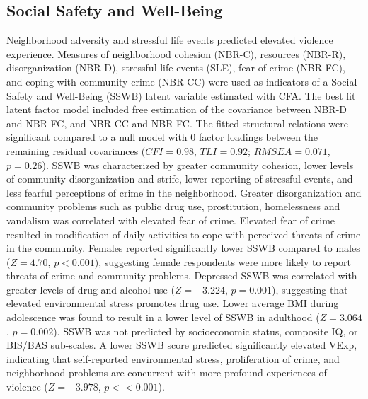 \documentclass[utf8]{article}
\begin{document}
\subsection{Social Safety and Well-Being} Neighborhood adversity and stressful life events predicted elevated violence experience. Measures of neighborhood cohesion (NBR-C), resources (NBR-R), disorganization (NBR-D), stressful life events (SLE), fear of crime (NBR-FC), and coping with community crime (NBR-CC) were used as indicators of a Social Safety and Well-Being (SSWB) latent variable estimated with CFA. The best fit latent factor model included free estimation of the covariance between NBR-D and NBR-FC, and NBR-CC and NBR-FC. The fitted structural relations were significant compared to a null model with $0$ factor loadings between the remaining residual covariances ($CFI=0.98$, $TLI=0.92$; $RMSEA=0.071$, $p=0.26$). SSWB was characterized by greater community cohesion, lower levels of community disorganization and strife, lower reporting of stressful events, and less fearful perceptions of crime in the neighborhood. Greater disorganization and community problems such as public drug use, prostitution, homelessness and vandalism was correlated with elevated fear of crime. Elevated fear of crime resulted in modification of daily activities to cope with perceived threats of crime in the community. Females reported significantly lower SSWB compared to males ($Z=4.70$, $p<0.001$), suggesting female respondents were more likely to report threats of crime and community problems. Depressed SSWB was correlated with greater levels of drug and alcohol use ($Z=-3.224$, $p=0.001$), suggesting that elevated environmental stress promotes drug use. Lower average BMI during adolescence was found to result in a lower level of SSWB in adulthood ($Z=3.064$, $p=0.002$). SSWB was not predicted by socioeconomic status, composite IQ, or BIS/BAS sub-scales. A lower SSWB score predicted significantly elevated VExp, indicating that self-reported environmental stress, proliferation of crime, and neighborhood problems are concurrent with more profound experiences of violence ($Z=-3.978$, $p<<0.001$). 
\end{document}
